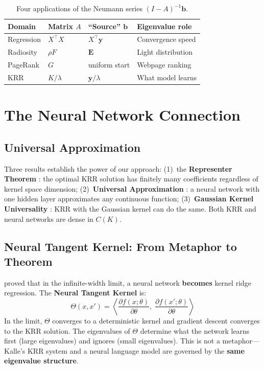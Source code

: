 \documentclass[11pt,a4paper]{article}
\begin{document}
\begin{table}[h]
\centering\small
\begin{tabular}{@{}llll@{}}
\toprule
Domain & Matrix $A$ & ``Source'' $\mathbf{b}$ & Eigenvalue role \\
\midrule
Regression & $X^\top X$   & $X^\top \mathbf{y}$ & Convergence speed \\
Radiosity  & $\rho F$     & $\mathbf{E}$        & Light distribution \\
PageRank   & $G$          & uniform start        & Webpage ranking \\
KRR        & $K/\lambda$  & $\mathbf{y}/\lambda$ & What model learns \\
\bottomrule
\end{tabular}
\caption{Four applications of the Neumann series $(I-A)^{-1}\mathbf{b}$.}
\end{table}


\section{The Neural Network Connection}\label{sec:ntk}

\subsection{Universal Approximation}

Three results establish the power of our approach: (1)~the \textbf{Representer Theorem} \citep{kimeldorf1970splines}: the optimal KRR solution has finitely many coefficients regardless of kernel space dimension; (2)~\textbf{Universal Approximation} \citep{cybenko1989approximation}: a neural network with one hidden layer approximates any continuous function; (3)~\textbf{Gaussian Kernel Universality} \citep{micchelli2006universal}: KRR with the Gaussian kernel can do the same. Both KRR and neural networks are dense in $C(K)$.

\subsection{Neural Tangent Kernel: From Metaphor to Theorem}

\citet{jacot2018ntk} proved that in the infinite-width limit, a neural network \textbf{becomes} kernel ridge regression. The \textbf{Neural Tangent Kernel} is:
\begin{equation}
  \Theta(x, x') = \left\langle \frac{\partial f(x; \theta)}{\partial \theta},\; \frac{\partial f(x'; \theta)}{\partial \theta} \right\rangle
\end{equation}
In the limit, $\Theta$ converges to a deterministic kernel and gradient descent converges to the KRR solution. The eigenvalues of $\Theta$ determine what the network learns first (large eigenvalues) and ignores (small eigenvalues). This is not a metaphor---Kalle's KRR system and a neural language model are governed by the \textbf{same eigenvalue structure}.
\end{document}
